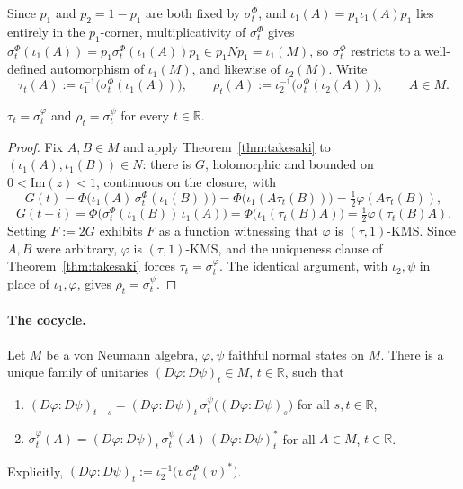 Since $p_1$ and $p_2=1-p_1$ are both fixed by $\sigma_t^\Phi$, and $\iota_1(A) = p_1\iota_1(A)p_1$ lies entirely in the $p_1$-corner, multiplicativity of $\sigma_t^\Phi$ gives $\sigma_t^\Phi(\iota_1(A)) = p_1\sigma_t^\Phi(\iota_1(A))p_1 \in p_1Np_1 = \iota_1(M)$, so $\sigma_t^\Phi$ restricts to a well-defined automorphism of $\iota_1(M)$, and likewise of $\iota_2(M)$. Write
\[
\tau_t(A) := \iota_1^{-1}\big(\sigma_t^\Phi(\iota_1(A))\big), \qquad \rho_t(A) := \iota_2^{-1}\big(\sigma_t^\Phi(\iota_2(A))\big), \qquad A \in M.
\]

\begin{proposition}\label{prop:corner-modular}
	$\tau_t = \sigma_t^\varphi$ and $\rho_t = \sigma_t^\psi$ for every $t \in \mathbb{R}$.
\end{proposition}

\begin{proof}
	Fix $A,B \in M$ and apply Theorem~\ref{thm:takesaki} to $(\iota_1(A),\iota_1(B)) \in N$: there is $G$, holomorphic and bounded on $0<\mathrm{Im}(z)<1$, continuous on the closure, with
	\[
	G(t) = \Phi\big(\iota_1(A)\,\sigma_t^\Phi(\iota_1(B))\big) = \Phi\big(\iota_1(A\tau_t(B))\big) = \tfrac12\varphi(A\tau_t(B)),
	\]
	\[
	G(t+i) = \Phi\big(\sigma_t^\Phi(\iota_1(B))\,\iota_1(A)\big) = \Phi\big(\iota_1(\tau_t(B)A)\big) = \tfrac12\varphi(\tau_t(B)A).
	\]
	Setting $F:=2G$ exhibits $F$ as a function witnessing that $\varphi$ is $(\tau,1)$-KMS. Since $A,B$ were arbitrary, $\varphi$ is $(\tau,1)$-KMS, and the uniqueness clause of Theorem~\ref{thm:takesaki} forces $\tau_t = \sigma_t^\varphi$. The identical argument, with $\iota_2,\psi$ in place of $\iota_1,\varphi$, gives $\rho_t=\sigma_t^\psi$.
\end{proof}

\paragraph{The cocycle.}
\begin{theorem}\label{thm:connes-cocycle}
	Let $M$ be a von Neumann algebra, $\varphi,\psi$ faithful normal states on $M$. There is a unique family of unitaries $(D\varphi:D\psi)_t \in M$, $t \in \mathbb{R}$, such that
	\begin{enumerate}
		\item[(i)] $(D\varphi:D\psi)_{t+s} = (D\varphi:D\psi)_t\,\sigma_t^\psi\big((D\varphi:D\psi)_s\big)$ for all $s,t \in \mathbb{R}$,
		\item[(ii)] $\sigma_t^\varphi(A) = (D\varphi:D\psi)_t\,\sigma_t^\psi(A)\,(D\varphi:D\psi)_t^*$ for all $A \in M$, $t \in \mathbb{R}$.
	\end{enumerate}
	Explicitly, $(D\varphi:D\psi)_t := \iota_2^{-1}\big(v\,\sigma_t^\Phi(v)^*\big)$.
\end{theorem}

